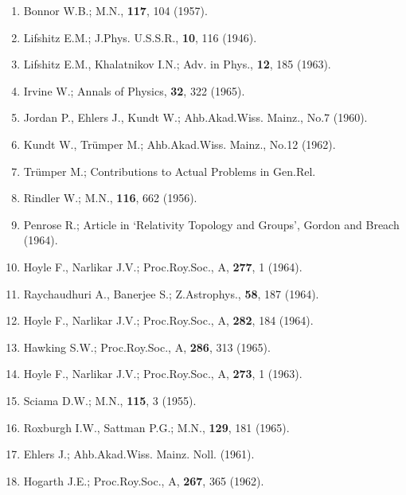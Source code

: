 \begin{enumerate}
\item Bonnor W.B.; M.N., \textbf{117}, 104 (1957).
\item Lifshitz E.M.; J.Phys. U.S.S.R., \textbf{10}, 116 (1946).
\item Lifshitz E.M., Khalatnikov I.N.; Adv. in Phys., \textbf{12}, 185 (1963).
\item Irvine W.; Annals of Physics, \textbf{32}, 322 (1965).
\item Jordan P., Ehlers J., Kundt W.; Ahb.Akad.Wiss. Mainz., No.7 (1960).
\item Kundt W., Trümper M.; Ahb.Akad.Wiss. Mainz., No.12 (1962).
\item Trümper M.; Contributions to Actual Problems in Gen.Rel.
\item Rindler W.; M.N., \textbf{116}, 662 (1956).
\item Penrose R.; Article in `Relativity Topology and Groups’, Gordon and Breach (1964).
\item Hoyle F., Narlikar J.V.; Proc.Roy.Soc., A, \textbf{277}, 1 (1964).
\item Raychaudhuri A., Banerjee S.; Z.Astrophys., \textbf{58}, 187 (1964).
\item Hoyle F., Narlikar J.V.; Proc.Roy.Soc., A, \textbf{282}, 184 (1964).
\item Hawking S.W.; Proc.Roy.Soc., A, \textbf{286}, 313 (1965).
\item Hoyle F., Narlikar J.V.; Proc.Roy.Soc., A, \textbf{273}, 1 (1963).
\item Sciama D.W.; M.N., \textbf{115}, 3 (1955).
\item Roxburgh I.W., Sattman P.G.; M.N., \textbf{129}, 181 (1965).
\item Ehlers J.; Ahb.Akad.Wiss. Mainz. Noll. (1961).
\item Hogarth J.E.; Proc.Roy.Soc., A, \textbf{267}, 365 (1962).
\end{enumerate}




